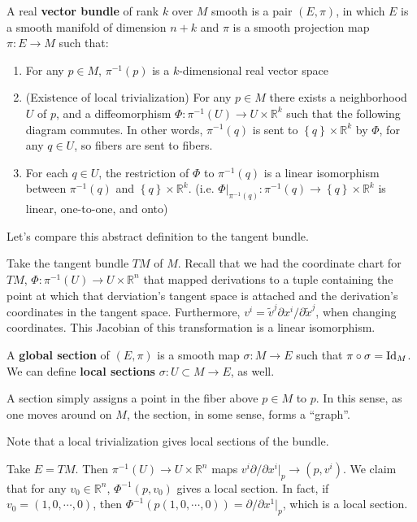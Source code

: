 \documentclass{../mathnotes}
\begin{document}
\begin{defn}
    A real \textbf{vector bundle} of rank $k$ over $M$ smooth is a pair $(E,\pi)$, in which $E$ is a smooth manifold of dimension
    $n+k$ and $\pi$ is a smooth projection map $\pi:E\to M$ such that:
    \begin{enumerate}
        \item For any $p\in M$, $\pi^{-1}(p)$ is a $k$-dimensional real vector space
        \item (Existence of local trivialization) For any $p\in M$ there exists a neighborhood $U$ of $p$, and
            a diffeomorphism $\Phi:\pi^{-1}(U)\to U\times \mathbb{R}^k$ such that the following diagram commutes.
            In other words, $\pi^{-1}(q)$ is sent to $\left\{ q \right\}\times \mathbb{R}^k$ by $\Phi$, for any $q\in U$,
            so fibers are sent to fibers.
        \item For each $q\in U$, the restriction of $\Phi$ to $\pi^{-1}(q)$ is a linear isomorphism between $\pi^{-1}(q)$
            and $\left\{ q \right\}\times \mathbb{R}^k$. (i.e. $\Phi|_{\pi^{-1}(q)}:\pi^{-1}(q)\to\left\{ q \right\}\times \mathbb{R}^k$
            is linear, one-to-one, and onto)
    \end{enumerate}
\end{defn}

Let's compare this abstract definition to the tangent bundle.
\begin{exmp}
    Take the tangent bundle $TM$ of $M$. Recall that we had the coordinate chart for $TM$, $\Phi:\pi^{-1}(U)\to U\times \mathbb{R}^n$
    that mapped derivations to a tuple containing the point at which that derviation's tangent space is attached and the
    derivation's coordinates in the tangent space. Furthermore, $v^i=\tilde{v}^j\partial x^i/\partial\tilde{x}^j$, when
    changing coordinates. This Jacobian of this transformation is a linear isomorphism.
\end{exmp}

\begin{defn}
    A \textbf{global section} of $(E,\pi)$ is a smooth map $\sigma:M\to E$ such that $\pi\circ\sigma=\operatorname{Id}_M$.
    We can define \textbf{local sections} $\sigma:U\subset M\to E$, as well.
\end{defn}
A section simply assigns a point in the fiber above $p\in M$ to $p$. In this sense, as one moves around on $M$, the section,
in some sense, forms a ``graph''. 

Note that a local trivialization gives local sections of the bundle.
\begin{exmp}
    Take $E=TM$. Then $\pi^{-1}(U)\to U\times \mathbb{R}^n$ maps $v^i\partial/\partial x^i|_p\to(p,v^i)$. We claim that
    for any $v_0\in \mathbb{R}^n$, $\Phi^{-1}(p,v_0)$ gives a local section. In fact, if $v_0=(1, 0, \cdots, 0)$, then
    $\Phi^{-1}(p(1,0,\cdots,0))=\partial/\partial x^1|_p$, which is a local section.
\end{exmp}
\end{document}
